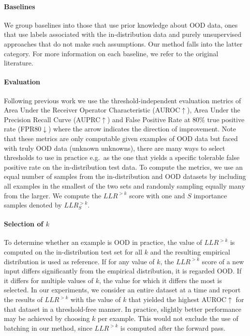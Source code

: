 {%
\paragraph{Baselines} We group baselines into those that use prior knowledge about OOD data, ones that use labels associated with the in-distribution data and purely unsupervised approaches that do not make such assumptions.
Our method falls into the latter category.
For more information on each baseline, we refer to the original literature.


\paragraph{Evaluation} Following previous work \parencite{hendrycks_baseline_2017, hendrycks_deep_2019, alemi_uncertainty_2018, ren_likelihood_2019, choi_waic_2019} we use the threshold-independent evaluation metrics of Area Under the Receiver Operator Characteristic (AUROC$\uparrow$), Area Under the Precision Recall Curve (AUPRC$\uparrow$) and False Positive Rate at 80\% true positive rate (FPR80$\downarrow$) where the arrow indicates the direction of improvement.
Note that these metrics are only computable given examples of OOD data but faced with truly OOD data (unknown unknowns), there are many ways to select thresholds to use in practice e.g.\ as the one that yields a specific tolerable false positive rate on the in-distribution test data.
To compute the metrics, we use an equal number of samples from the in-distribution and OOD datasets by including all examples in the smallest of the two sets and randomly sampling equally many from the larger. We compute the $LLR^{>k}$ score with one and $S$ importance samples denoted by $LLR^{>k}_S$.

\paragraph{Selection of $k$} To determine whether an example is OOD in practice, the value of $LLR^{>k}$ is computed on the in-distribution test set for all $k$ and the resulting empirical distribution is used as reference.
If for any value of $k$, the $LLR^{>k}$ score of a new input differs significantly from the empirical distribution, it is regarded OOD.
If it differs for multiple values of $k$, the value for which it differs the most is selected.
In our experiments, we consider an entire dataset at a time and report the results of $LLR^{>k}$ with the value of $k$ that yielded the highest AUROC$\uparrow$ for that dataset in a threshold-free manner.
In practice, slightly better performance may be achieved by choosing $k$ per example.
This would not exclude the use of batching in our method, since $LLR^{>k}$ is computed after the forward pass.


}
